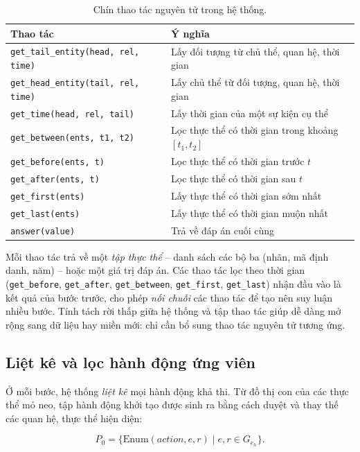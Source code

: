 \begin{table}[ht]
\centering
\caption{Chín thao tác nguyên tử trong hệ thống.}
\label{tab:actions}
\begin{tabular}{L{6.0cm} L{6.7cm}}
\toprule
\textbf{Thao tác} & \textbf{Ý nghĩa} \\
\midrule
\texttt{get\_tail\_entity(head, rel, time)} & Lấy đối tượng từ chủ thể, quan hệ, thời gian \\
\texttt{get\_head\_entity(tail, rel, time)} & Lấy chủ thể từ đối tượng, quan hệ, thời gian \\
\texttt{get\_time(head, rel, tail)} & Lấy thời gian của một sự kiện cụ thể \\
\texttt{get\_between(ents, t1, t2)} & Lọc thực thể có thời gian trong khoảng $[t_1, t_2]$ \\
\texttt{get\_before(ents, t)} & Lọc thực thể có thời gian trước $t$ \\
\texttt{get\_after(ents, t)} & Lọc thực thể có thời gian sau $t$ \\
\texttt{get\_first(ents)} & Lấy thực thể có thời gian sớm nhất \\
\texttt{get\_last(ents)} & Lấy thực thể có thời gian muộn nhất \\
\texttt{answer(value)} & Trả về đáp án cuối cùng \\
\bottomrule
\end{tabular}
\end{table}

Mỗi thao tác trả về một \textit{tập thực thể} -- danh sách các bộ ba (nhãn, mã định danh, năm) --
hoặc một giá trị đáp án. Các thao tác lọc theo thời gian (\texttt{get\_before}, \texttt{get\_after},
\texttt{get\_between}, \texttt{get\_first}, \texttt{get\_last}) nhận đầu vào là kết quả của bước
trước, cho phép \emph{nối chuỗi} các thao tác để tạo nên suy luận nhiều bước. Tính tách rời thấp
giữa hệ thống và tập thao tác giúp dễ dàng mở rộng sang dữ liệu hay miền mới: chỉ cần bổ sung thao
tác nguyên tử tương ứng.

\subsection{Liệt kê và lọc hành động ứng viên}
\label{sec:enumerate}

Ở mỗi bước, hệ thống \emph{liệt kê} mọi hành động khả thi. Từ đồ thị con của các thực thể mỏ neo,
tập hành động khởi tạo được sinh ra bằng cách duyệt và thay thế các quan hệ, thực thể hiện diện:

\begin{equation}
\label{eq:enum}
P_0 = \{\mathrm{Enum}(\textit{action}, e, r) \mid e, r \in G_{e_h}\}.
\end{equation}

